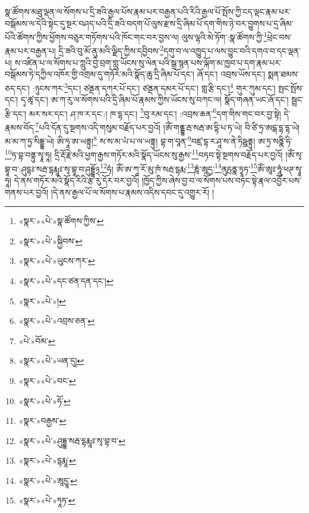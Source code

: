 སྣ་ཚོགས་མཐུ་ལྡན་ལ་སོགས་པ་དྲི་ཟའི་རྒྱལ་པོས་རྣམ་པར་བརྒྱན་པའི་རིའི་རྒྱལ་པོ་སྤོས་ཀྱི་ངད་ལྡང་རྣམ་པར་བསྒོམས་ལ་དེའི་སྟེང་དུ་སྔར་བཤད་པའི་དྲི་ཟའི་བདག་པོ་ལུས་རྫས་དྲི་ཞིམ་པོ་དག་གིས་ཉེ་བར་བྱུགས་པ་དྲ་ཞིམ་པོའི་ཚོགས་ཀྱིས་ཕྱོགས་བཅུར་གཏོགས་པའི་ཁོང་གང་བར་བྱས་ལ། ལུས་ལྷའི་མེ་ཏོག་:སྣ་ཚོགས་ཀྱི་\footnote{«སྣར་»«པེ་»སྣ་ཚོགས་ཀྱིས་}ཕྲེང་བས་རྣམ་པར་བརྒྱན་པ། དྲི་ཟའི་བུ་མོ་ནུ་མའི་ལྗིད་ཀྱིས་དབྱིབས་\footnote{«སྣར་»«པེ་»སྐྱིབས་}དགུ་བ་ལ་འཁྱུད་པ་ལས་བྱུང་བའི་དགའ་བ་དང་ལྡན་པ། ས་འཛིན་པ་ལ་སོགས་པ་ཀླུའི་བྱེ་བྲག་གླུ་ཡོངས་སུ་ལེན་པའི་སྒྲ་སྙན་པས་ལྐོག་མ་ཁྱབ་པ་དག་རྣམ་པར་བསྒོམས་ཏེ་དཀྱིལ་འཁོར་གྱི་འགྲམ་དུ་གཏོར་མའི་སྣོད་ཆུ་དྲི་ཞིམ་པོ་དང་། ཞོ་དང་། འབྲས་ཡོས་དང་། སྨན་ཐམས་ཅད་དང་། :ཉུངས་ཀར་\footnote{«སྣར་»«པེ་»ཡུངས་ཀར་}དང་། ཙནྡན་དཀར་པོ་དང་། ཙནྡན་དམར་པོ་དང་། གླ་རྩི་དང་།\footnote{«སྣར་»«པེ་»དང་ཙན་དན་དང་།} གུར་ཀུམ་དང་། སྤང་སྤོས་དང་། དྭ་ཚྭ་དང་། ཨ་ཀ་རུ་ལ་སོགས་པའི་དྲི་ཞིམ་པོ་རྣམས་ཀྱིས་ཡོངས་སུ་བཀང་ལ། སྣོད་གཞན་ཡང་ཞོ་དང་། སྦྲང་རྩི་དང་། མར་སར་དང་། ཤ་ཁ་ར་དང་:། ཁ་དྷ་དང་། \footnote{«སྣར་»«པེ་»།  }བུ་རམ་དང་། :འབྲས་ཆན་\footnote{«སྣར་»«པེ་»འབྲས་ཅན་}དག་གིས་གང་བར་བྱ་སྟེ། དེ་རྣམས་བོད་\footnote{«པེ་»བོམ་}པའི་དོན་དུ་སྔགས་འདི་གསུམ་བརྗོད་པར་བྱའོ། །ཨོཾ་གནྡྷ་རྦ་སརྦ་ཨ་དྷི་པ་ཏ་ཡེ། བི་ཙི་ཏྲ་ཨངྒ་དྷ་དྷ་ཡེ། མ་མ་ཀ་ཏྱ་སིདྡྷ་ཡེ། ཨི་ཧཱ་ཨ་ཡནྟུ།\footnote{«སྣར་»«པེ་»ཡན་དུ།} ས་ས་མ་ཡཾ་པ་ལ་ཡནྟུ། བྷ་ག་བཱན་\footnote{«སྣར་»«པེ་»བང་}བཛྲ་དྷ་ར་ཤཱ་ས་ནེ་ཏིཥྛནྟུ། ཨ་ཏྲ་སནྣི་ཧི་\footnote{«སྣར་»«པེ་»ཧོ་}ཏ་བྷ་བནྟུ་སྭཱ་ཧཱ། དྲི་རྡོ་རྗེ་མའི་ཕྱག་རྒྱས་གཏོར་མའི་སྣོད་ཡོངས་སུ་རྒྱས་\footnote{«སྣར་»བརྒྱས་}བཏབ་སྟེ་སྔགས་བརྗོད་པར་བྱའོ། །ཨོཾ་སྭ་བྷཱ་བ་:ཤུདྷཿ་སརྦ་དྷརྨཱཿ་སྭ་བྷཱ་བ་ཤུདྡྷོ྅\footnote{«སྣར་»«པེ་»ཤུདྡྷ་སརྦ་དྷརྨཱཿ་སྭ་བྷ་བ་}ཧཾ། ཨོཾ་ཨ་ཀཱ་རོ་མུ་ཁཾ་སརྦ་དྷརྨ་\footnote{«སྣར་»«པེ་»དྷརྨཱ་}ཎཱཾ་ཨཱདྱ་\footnote{«སྣར་»«པེ་»ཨཱདྱཱ་}ནུདྤནྣ་ཏྭཱཏ་\footnote{«སྣར་»«པེ་»ཏཱཏ་}ཨོཾ་ཨཱཿ་ཧཱུཾ་ཕཊ་སྭཱ་ཧཱ། དེ་ནས་གཏོར་མའི་སྣོད་རིའི་རྩ་རུ་དོར་བར་བྱའོ། །ཁྱོད་ཀྱིས་ཞེས་བྱ་བ་ལ་སོགས་པས་བཏང་སྟེ་རྣལ་འབྱོར་པས་གནས་པར་བྱའོ། །དེ་ནས་རྒྱལ་པོ་ལ་སོགས་པ་རྣམས་འདིས་དབང་དུ་འགྱུར་རོ། །
